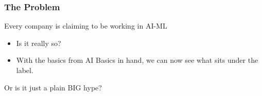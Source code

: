 \begin{frame}[fragile]\frametitle{The Problem}
Every company is claiming to be working in AI-ML
\begin{itemize}
\item Is it really so?
\item With the basics from AI Basics in hand, we can now see what sits under the label.
\end{itemize}
Or is it just a plain BIG hype?
\end{frame}







